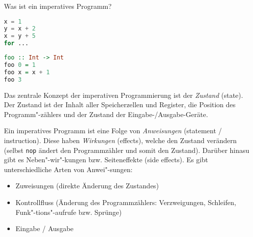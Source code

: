 \begin{question}[folgend]
    Was ist ein imperatives Programm?
\end{question}



\begin{lstlisting}[language=Python, caption=Imperatives Programm]
x = 1
y = x + 2
x = y + 5
for ...
\end{lstlisting}


\begin{lstlisting}[language=Haskell, caption=Funktionales Programm]
foo :: Int -> Int
foo 0 = 1
foo x = x + 1
foo 3
\end{lstlisting}

Das zentrale Konzept der imperativen Programmierung ist der \emph{Zustand} (state). Der Zustand ist der Inhalt aller Speicherzellen und Register, die Position des Programm"-zählers und der Zustand der Eingabe-/Ausgabe-Geräte.

Ein imperatives Programm ist eine Folge von \emph{Anweisungen} (statement / instruction). Diese haben \emph{Wirkungen} (effects), welche den Zustand verändern (selbst \texttt{nop} ändert den Programmzähler und somit den Zustand). Darüber hinasu gibt es Neben"-wir"-kungen bzw. Seiteneffekte (side effects). Es gibt unterschiedliche Arten von Anwei"-sungen:
\begin{itemize}
    \item Zuweisungen (direkte Änderung des Zustandes)
    \item Kontrollfluss (Änderung des Programmzählers: Verzweigungen, Schleifen, Funk"-tions"-aufrufe bzw. Sprünge)
    \item Eingabe / Ausgabe
\end{itemize}
